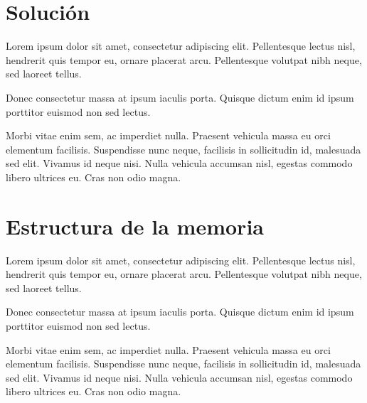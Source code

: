 \section*{Solución}

Lorem ipsum dolor sit amet, consectetur adipiscing elit. Pellentesque lectus
nisl, hendrerit quis tempor eu, ornare placerat arcu. Pellentesque volutpat nibh
neque, sed laoreet tellus.

Donec consectetur massa at ipsum iaculis porta. Quisque dictum enim id ipsum
porttitor euismod non sed lectus.

Morbi vitae enim sem, ac imperdiet nulla. Praesent vehicula massa eu orci
elementum facilisis. Suspendisse nunc neque, facilisis in sollicitudin id,
malesuada sed elit. Vivamus id neque nisi. Nulla vehicula accumsan nisl, egestas
commodo libero ultrices eu. Cras non odio magna.

\section*{Estructura de la memoria}

Lorem ipsum dolor sit amet, consectetur adipiscing elit. Pellentesque lectus
nisl, hendrerit quis tempor eu, ornare placerat arcu. Pellentesque volutpat nibh
neque, sed laoreet tellus.

Donec consectetur massa at ipsum iaculis porta. Quisque dictum enim id ipsum
porttitor euismod non sed lectus.

Morbi vitae enim sem, ac imperdiet nulla. Praesent vehicula massa eu orci
elementum facilisis. Suspendisse nunc neque, facilisis in sollicitudin id,
malesuada sed elit. Vivamus id neque nisi. Nulla vehicula accumsan nisl, egestas
commodo libero ultrices eu. Cras non odio magna.
